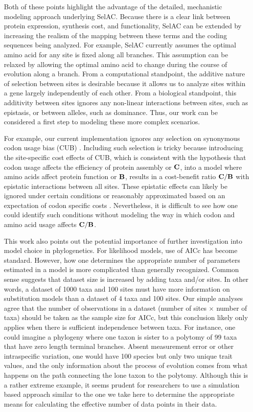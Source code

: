 \documentclass[12pt,letterpaper,fleqn]{article}
\newcommand{\Cost}{\ensuremath{\text{\textbf{C}}}\xspace}
\newcommand{\Func}{\ensuremath{\text{\textbf{B}}}\xspace}
\newcommand{\selac}{SelAC\xspace}
\begin{document}
Both of these points highlight the advantage of the detailed, mechanistic modeling approach underlying \selac.
Because there is a clear link between protein expression, synthesis cost, and functionality, \selac can be extended by increasing the realism of the mapping between these terms and the coding sequences being analyzed.
For example, \selac currently assumes the optimal amino acid for any site is fixed along all branches.
This assumption can be relaxed by allowing the optimal amino acid to change during the course of evolution along a branch.
From a computational standpoint, the additive nature of selection between sites is desirable because it allows us to analyze sites within a gene largely independently of each other.
From a biological standpoint, this additivity between sites ignores any non-linear interactions between sites, such as epistasis, or between alleles, such as dominance.
Thus, our work can be considered a first step to modeling these more complex scenarios.

For example, our current implementation ignores any selection on synonymous codon usage bias (CUB) \citep[c.f.~][]{YangAndNielsen2008,PouyetEtAl2016}.
Including such selection is tricky because introducing the site-specific cost effects of CUB, which is consistent with the hypothesis that codon usage affects the efficiency of protein assembly or \Cost, into a model where amino acids affect protein function or \Func, results in a cost-benefit ratio $\Cost/\Func$ with epistatic interactions between all sites.
These epistatic effects can likely be ignored under certain conditions or reasonably approximated based on an expectation of codon specific costs \citep[e.g.~][]{KubatkoEtAl2016}.
Nevertheless, it is difficult to see how one could identify such conditions without modeling the way in which codon and amino acid usage affects $\Cost/\Func$.

This work also points out the potential importance of further investigation into model choice in phylogenetics.
For likelihood models, use of AICc has become standard.
However, how one determines the appropriate number of parameters estimated in a model is more complicated than generally recognized.
Common sense suggests that dataset size is increased by adding taxa and/or sites.
In other words, a dataset of 1000 taxa and 100 sites must have more information on substitution models than a dataset of 4 taxa and 100 sites.
Our simple analyses agree that the number of observations in a dataset (number of sites $\times$ number of taxa) should be taken as the sample size for AICc, but this conclusion likely only applies when there is sufficient independence between taxa.
For instance, one could imagine a phylogeny where one taxon is sister to a polytomy of 99 taxa that have zero length terminal branches.
Absent measurement error or other intraspecific variation, one would have 100 species but only two unique trait values, and the only information about the process of evolution comes from what happens on the path connecting the lone taxon to the polytomy.
Although this is a rather extreme example, it seems prudent for researchers to use a simulation based approach similar to the one we take here to determine the appropriate means for calculating the effective number of data points in their data.
\end{document}
